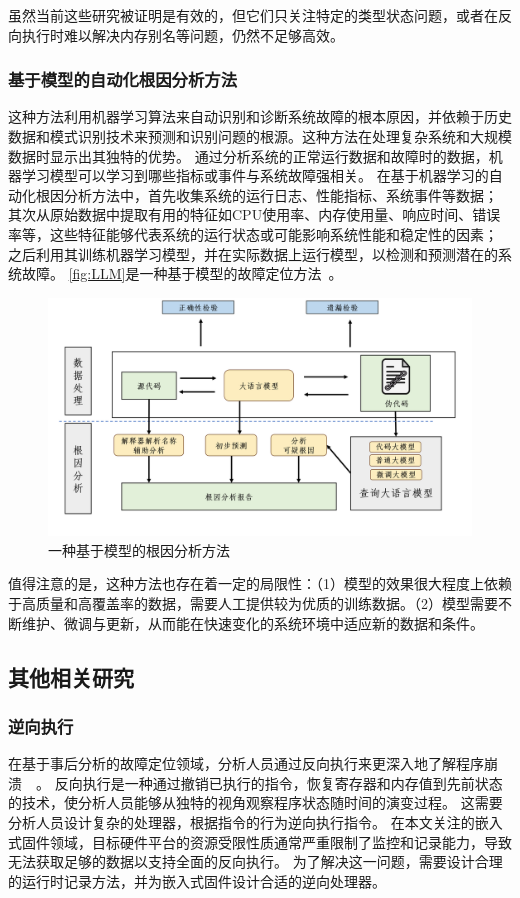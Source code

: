 虽然当前这些研究被证明是有效的，但它们只关注特定的类型状态问题，或者在反向执行时难以解决内存别名等问题，仍然不足够高效。
\subsubsection{基于模型的自动化根因分析方法}
这种方法利用机器学习算法来自动识别和诊断系统故障的根本原因，并依赖于历史数据和模式识别技术来预测和识别问题的根源。这种方法在处理复杂系统和大规模数据时显示出其独特的优势。
通过分析系统的正常运行数据和故障时的数据，机器学习模型可以学习到哪些指标或事件与系统故障强相关。
在基于机器学习的自动化根因分析方法中，首先收集系统的运行日志、性能指标、系统事件等数据；
其次从原始数据中提取有用的特征如CPU使用率、内存使用量、响应时间、错误率等，这些特征能够代表系统的运行状态或可能影响系统性能和稳定性的因素；
之后利用其训练机器学习模型，并在实际数据上运行模型，以检测和预测潜在的系统故障。
\autoref{fig:LLM}是一种基于模型的故障定位方法~\cite{How2024}。
\begin{figure}[h]
    \centering
    \includegraphics[width=1.0\textwidth]{./figure/LLM.png}
    \caption{一种基于模型的根因分析方法}
    \label{fig:LLM}
\end{figure}

值得注意的是，这种方法也存在着一定的局限性：（1）模型的效果很大程度上依赖于高质量和高覆盖率的数据，需要人工提供较为优质的训练数据。（2）模型需要不断维护、微调与更新，从而能在快速变化的系统环境中适应新的数据和条件。


\subsection{其他相关研究}
\subsubsection{逆向执行}
在基于事后分析的故障定位领域，分析人员通过反向执行来更深入地了解程序崩溃~\cite{RETracer2016}~\cite{REPT}。
反向执行是一种通过撤销已执行的指令，恢复寄存器和内存值到先前状态的技术，使分析人员能够从独特的视角观察程序状态随时间的演变过程。
这需要分析人员设计复杂的处理器，根据指令的行为逆向执行指令。
在本文关注的嵌入式固件领域，目标硬件平台的资源受限性质通常严重限制了监控和记录能力，导致无法获取足够的数据以支持全面的反向执行。
为了解决这一问题，需要设计合理的运行时记录方法，并为嵌入式固件设计合适的逆向处理器。


